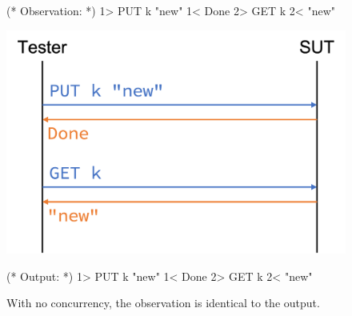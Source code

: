 \begin{figure}
  \centering
  \begin{minipage}[c]{.3\textwidth}
\begin{coq}
  (* Observation: *)
  1> PUT k "new"
  1< Done
  2> GET k
  2< "new"
\end{coq}
  \end{minipage}\begin{minipage}[c]{.4\textwidth}
  \includegraphics[width=\linewidth]{figures/linear-trace}
  \end{minipage}\begin{minipage}[c]{.3\textwidth}
\begin{coq}
  (* Output: *)
  1> PUT k "new"
  1< Done
  2> GET k
  2< "new"
\end{coq}
  \end{minipage}
  \caption[Linear trace with no concurrency.]{With no concurrency, the
    observation is identical to the output.}
  \label{fig:linear-trace}
\end{figure}
